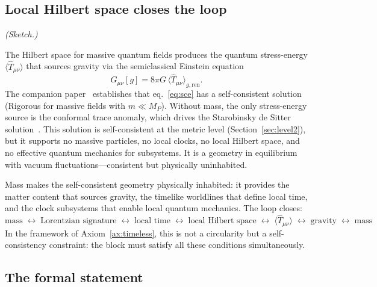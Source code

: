 \documentclass[12pt,a4paper]{article}
\theoremstyle{definition}
\theoremstyle{remark}
\begin{document}
\subsection{Local Hilbert space closes the loop}
\label{sec:hilbert_mass}

\emph{(Sketch.)}

\medskip

\noindent The Hilbert space for massive quantum fields produces the
quantum stress-energy $\langle\hat{T}_{\mu\nu}\rangle$ that sources
gravity via the semiclassical Einstein equation
\begin{equation}
G_{\mu\nu}[g] = 8\pi G\,\langle\hat{T}_{\mu\nu}\rangle_{g,\mathrm{ren}}.
\label{eq:sce}
\end{equation}
The companion paper~\cite{fixed_point} establishes that eq.~\eqref{eq:sce}
has a self-consistent solution (Rigorous for massive fields with
$m \ll M_P$). Without mass, the only stress-energy source is the conformal
trace anomaly, which drives the Starobinsky de Sitter
solution~\cite{starobinsky}. This solution is self-consistent at the
metric level (Section~\ref{sec:level2}), but it supports no massive
particles, no local clocks, no local Hilbert space, and no effective
quantum mechanics for subsystems. It is a geometry in equilibrium with
vacuum fluctuations---consistent but physically uninhabited.

Mass makes the self-consistent geometry physically inhabited: it provides
the matter content that sources gravity, the timelike worldlines that
define local time, and the clock subsystems that enable local quantum
mechanics. The loop closes:
\begin{equation}
\text{mass} \;\longleftrightarrow\; \text{Lorentzian signature}
\;\longleftrightarrow\; \text{local time}
\;\longleftrightarrow\; \text{local Hilbert space}
\;\longleftrightarrow\; \langle\hat{T}_{\mu\nu}\rangle
\;\longleftrightarrow\; \text{gravity}
\;\longleftrightarrow\; \text{mass}
\label{eq:co_emergence}
\end{equation}
In the framework of Axiom~\ref{ax:timeless}, this is not a circularity
but a self-consistency constraint: the block must satisfy all these
conditions simultaneously.

\subsection{The formal statement}
\label{sec:formal_coemergence}
\end{document}
